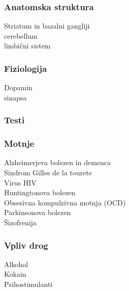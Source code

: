 \documentclass[10pt,a4paper]{article}
\begin{document}
\subsubsection{Anatomska struktura}
Striatum in bazalni gangliji\\
cerebellum\\
limbični sistem

\subsubsection{Fiziologija}
Dopamin\\
sinapsa

\subsubsection{Testi}

\subsubsection{Motnje}
Alzheimerjeva bolezen in demenca\\
Sindrom Gilles de la tourete\\
Virus HIV\\
Huntingtonova bolezen\\
Obsesivna kompulzivna motnja (OCD)\\
Parkinsonova bolezen\\
Šizofrenija

\subsubsection{Vpliv drog}
Alkohol\\
Kokain\\
Psihostimulanti

\section{}
\end{document}
